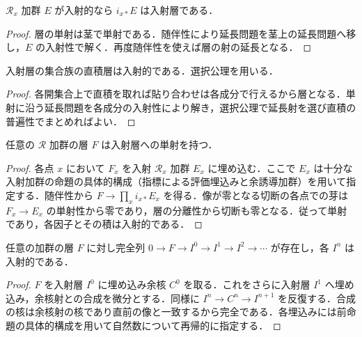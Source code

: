 \begin{prop}[点に集中する入射層]
$\mathcal R_x$ 加群 $E$ が入射的なら $i_{x*}E$ は入射層である．
\end{prop}
\begin{proof}
層の単射は茎で単射である．随伴性により延長問題を茎上の延長問題へ移し，$E$ の入射性で解く．再度随伴性を使えば層の射の延長となる．
\end{proof}
\begin{prop}[入射層の積]
入射層の集合族の直積層は入射的である．選択公理を用いる．
\end{prop}
\begin{proof}
各開集合上で直積を取れば貼り合わせは各成分で行えるから層となる．単射に沿う延長問題を各成分の入射性により解き，選択公理で延長射を選び直積の普遍性でまとめればよい．
\end{proof}
\begin{prop}[十分な入射層の存在]
任意の $\mathcal R$ 加群の層 $F$ は入射層への単射を持つ．
\end{prop}
\begin{proof}
各点 $x$ において $F_x$ を入射 $\mathcal R_x$ 加群 $E_x$ に埋め込む．ここで $E_x$ は十分な入射加群の命題の具体的構成（指標による評価埋込みと余誘導加群）を用いて指定する．随伴性から $F\to\prod_x i_{x*}E_x$ を得る．像が零となる切断の各点での芽は $F_x\to E_x$ の単射性から零であり，層の分離性から切断も零となる．従って単射であり，各因子とその積は入射的である．
\end{proof}
\begin{prop}[入射分解]
任意の加群の層 $F$ に対し完全列 $0\to F\to I^0\to I^1\to I^2\to\cdots$ が存在し，各 $I^n$ は入射的である．
\end{prop}
\begin{proof}
$F$ を入射層 $I^0$ に埋め込み余核 $C^0$ を取る．これをさらに入射層 $I^1$ へ埋め込み，余核射との合成を微分とする．同様に $I^n\to C^n\to I^{n+1}$ を反復する．合成の核は余核射の核であり直前の像と一致するから完全である．各埋込みには前命題の具体的構成を用いて自然数について再帰的に指定する．
\end{proof}
